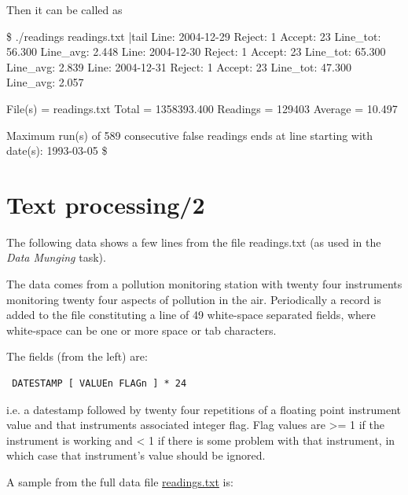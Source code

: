 \begin{wideverbatim}


Then it can be called as

\$ ./readings readings.txt |tail
Line:  2004-12-29  Reject: 1 Accept: 23  Line_tot: 56.300  Line_avg: 2.448
Line:  2004-12-30  Reject: 1 Accept: 23  Line_tot: 65.300  Line_avg: 2.839
Line:  2004-12-31  Reject: 1 Accept: 23  Line_tot: 47.300  Line_avg: 2.057

File(s)  = readings.txt
Total    = 1358393.400
Readings = 129403
Average  = 10.497

Maximum run(s) of 589 consecutive false readings ends at line starting
with date(s): 1993-03-05
\$

\end{wideverbatim}

\pagebreak{}
\section*{Text processing/2}

The following data shows a few lines from the file readings.txt (as used
in the \emph{Data Munging} task).

The data comes from a pollution monitoring station with twenty four
instruments monitoring twenty four aspects of pollution in the air.
Periodically a record is added to the file constituting a line of 49
white-space separated fields, where white-space can be one or more space
or tab characters.

The fields (from the left) are:

\begin{verbatim}
 DATESTAMP [ VALUEn FLAGn ] * 24
\end{verbatim}

i.e. a datestamp followed by twenty four repetitions of a floating point
instrument value and that instruments associated integer flag. Flag
values are \textgreater{}= 1 if the instrument is working and
\textless{} 1 if there is some problem with that instrument, in which
case that instrument's value should be ignored.

A sample from the full data file
\href{http://rosettacode.org/resources/readings.zip}{readings.txt} is:

